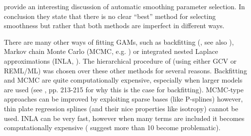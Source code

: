 
 provide an interesting discussion of automatic smoothing parameter selection. In conclusion they state that there is no clear ``best'' method for selecting smoothness but rather that both methods are imperfect in different ways. 




There are many other ways of fitting GAMs, such as backfitting (\cite{gammonograph}, see also ), Markov chain Monte Carlo (MCMC, e.g. \cite{fahrmeir2004}) or integrated nested Laplace approximations (INLA, \cite{inla}). The hierarchical procedure of  (using either GCV or REML/ML) was chosen over these other methods for several reasons. Backfitting and MCMC are quite computationally expensive, especially when larger models are used (see \cite{simonbook}, pp. 213-215 for why this is the case for backfitting). MCMC-type approaches can be improved by exploiting sparse bases (like P-splines) however, thin plate regression splines (and their nice properties like isotropy) cannot be used. INLA can be very fast, however when many terms are included it becomes computationally expensive (\cite{inla} suggest more than 10 become problematic).

